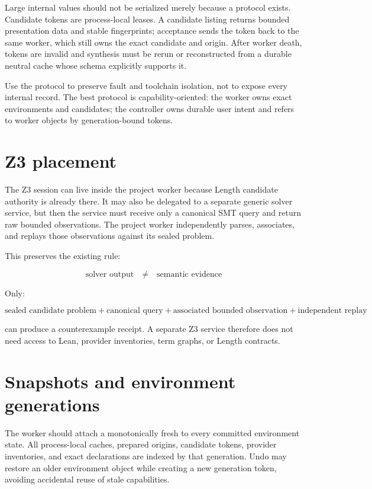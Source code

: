 \documentclass[10pt,letterpaper,oneside]{report}
\newcommand{\code}[1]{\texttt{\detokenize{#1}}}
\begin{document}
Large internal values should not be serialized merely because a protocol exists. Candidate tokens are process-local leases. A candidate listing returns bounded presentation data and stable fingerprints; acceptance sends the token back to the same worker, which still owns the exact candidate and origin. After worker death, tokens are invalid and synthesis must be rerun or reconstructed from a durable neutral cache whose schema explicitly supports it.

\begin{designbox}
Use the protocol to preserve fault and toolchain isolation, not to expose every internal record. The best protocol is capability-oriented: the worker owns exact environments and candidates; the controller owns durable user intent and refers to worker objects by generation-bound tokens.
\end{designbox}

\section{Z3 placement}

The Z3 session can live inside the project worker because Length candidate authority is already there. It may also be delegated to a separate generic solver service, but then the service must receive only a canonical SMT query and return raw bounded observations. The project worker independently parses, associates, and replays those observations against its sealed problem.

This preserves the existing rule:

\[
\text{solver output} \quad\neq\quad \text{semantic evidence}
\]

Only:

\[
\text{sealed candidate problem}
+ \text{canonical query}
+ \text{associated bounded observation}
+ \text{independent replay}
\]

can produce a counterexample receipt. A separate Z3 service therefore does not need access to Lean, provider inventories, term graphs, or Length contracts.

\section{Snapshots and environment generations}

The worker should attach a monotonically fresh \code{EnvGeneration} to every committed environment state. All process-local caches, prepared origins, candidate tokens, provider inventories, and exact declarations are indexed by that generation. Undo may restore an older environment object while creating a new generation token, avoiding accidental reuse of stale capabilities.
\end{document}
